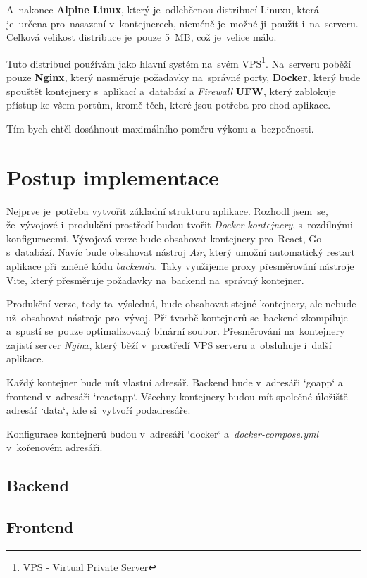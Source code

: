\documentclass[14pt,a4paper]{article}
\begin{document}
            A~nakonec \textbf{Alpine Linux}, který je~odlehčenou distribucí Linuxu, která je~určena pro~nasazení v~kontejnerech,
            nicméně je~možné ji~použít i~na~serveru. Celková velikost distribuce je~pouze 5~MB, což je~velice málo.

            Tuto distribuci používám jako hlavní systém na~svém VPS\footnote{VPS - Virtual Private Server}.
            Na~serveru poběží pouze \textbf{Nginx}, který nasměruje požadavky na~správné porty,
            \textbf{Docker}, který bude spouštět kontejnery s~aplikací a~databází a \emph{Firewall} \textbf{UFW}, který zablokuje přístup ke všem portům,
            kromě těch, které jsou potřeba pro chod aplikace.

            Tím bych chtěl dosáhnout maximálního poměru výkonu a~bezpečnosti.
	
	\section{Postup implementace}
        Nejprve je~potřeba vytvořit základní strukturu aplikace. Rozhodl jsem~se, že~vývojové i~produkční prostředí budou tvořit \emph{Docker kontejnery}, s~rozdílnými konfiguracemi.
        Vývojová verze bude obsahovat kontejnery pro~React, Go s~databází. Navíc bude obsahovat nástroj \emph{Air}, který umožní automatický restart aplikace při~změně kódu \emph{backendu}. Taky využijeme proxy přesměrování nástroje Vite, který přesměruje požadavky na~backend na~správný kontejner.

        Produkční verze, tedy ta~výsledná, bude obsahovat stejné kontejnery, ale nebude už~obsahovat nástroje pro~vývoj. Při tvorbě kontejnerů se~backend zkompiluje a~spustí se~pouze optimalizovaný binární soubor.
        Přesměrování na~kontejnery zajistí server \emph{Nginx}, který běží v~prostředí VPS serveru a~obsluhuje i~další aplikace.

        Každý kontejner bude mít vlastní adresář. Backend bude v~adresáři `goapp` a frontend v~adresáři `reactapp`. Všechny kontejnery budou mít společné úložiště adresář `data`, kde si~vytvoří podadresáře.

        Konfigurace kontejnerů budou v~adresáři `docker` a~\emph{docker-compose.yml} v~kořenovém adresáři.
        \subsection{Backend}
        \subsection{Frontend}
\end{document}

